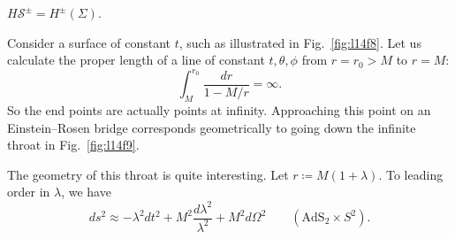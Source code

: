 \begin{remark}
  $H\mathcal{S}^{\pm} = H^{\pm}(\Sigma)$.
\end{remark}

Consider a surface of constant $t$, such as illustrated in Fig.~\ref{fig:l14f8}. Let us calculate the proper length of a line of constant $t, \theta, \phi$ from $r = r_0 > M$ to $r = M$:
\begin{equation}
  \int_M^{r_0} \frac{dr}{1 - M / r} = \infty.
\end{equation}
So the end points are actually points at infinity.
Approaching this point on an Einstein--Rosen bridge corresponds geometrically to going down the infinite throat in Fig.~\ref{fig:l14f9}.

The geometry of this throat is quite interesting. Let $r \coloneqq M (1 + \lambda)$. To leading order in $\lambda$, we have
\begin{equation}
  ds^2 \approx - \lambda^2 dt^2 + M^2 \frac{d\lambda^2}{\lambda^2} + M^2 d\Omega^2 \qquad (\text{AdS}_2 \times S^2).
\end{equation}
